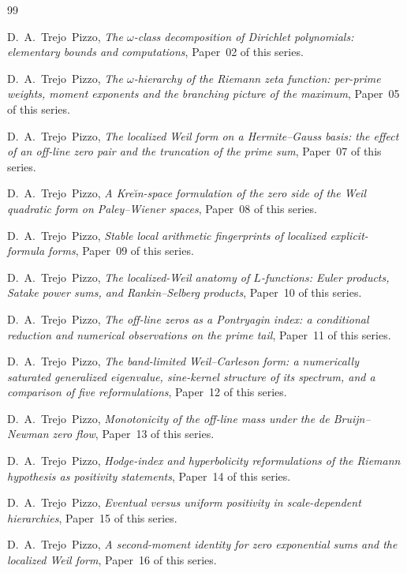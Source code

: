 \documentclass[11pt]{amsart}
\theoremstyle{definition}
\theoremstyle{remark}
\begin{document}
\begin{thebibliography}{99}

D.~A.\ Trejo~Pizzo,
\emph{The $\omega$-class decomposition of Dirichlet polynomials: elementary bounds and computations},
Paper~02 of this series.

D.~A.\ Trejo~Pizzo,
\emph{The $\omega$-hierarchy of the Riemann zeta function: per-prime weights, moment exponents and the branching picture of the maximum},
Paper~05 of this series.

D.~A.\ Trejo~Pizzo,
\emph{The localized Weil form on a Hermite--Gauss basis: the effect of an off-line zero pair and the truncation of the prime sum},
Paper~07 of this series.

D.~A.\ Trejo~Pizzo,
\emph{A Kre\u\i n-space formulation of the zero side of the Weil quadratic form on Paley--Wiener spaces},
Paper~08 of this series.

D.~A.\ Trejo~Pizzo,
\emph{Stable local arithmetic fingerprints of localized explicit-formula forms},
Paper~09 of this series.

D.~A.\ Trejo~Pizzo,
\emph{The localized-Weil anatomy of $L$-functions: Euler products, Satake power sums, and Rankin--Selberg products},
Paper~10 of this series.

D.~A.\ Trejo~Pizzo,
\emph{The off-line zeros as a Pontryagin index: a conditional reduction and numerical observations on the prime tail},
Paper~11 of this series.

D.~A.\ Trejo~Pizzo,
\emph{The band-limited Weil--Carleson form: a numerically saturated generalized eigenvalue, sine-kernel structure of its spectrum, and a comparison of five reformulations},
Paper~12 of this series.

D.~A.\ Trejo~Pizzo,
\emph{Monotonicity of the off-line mass under the de Bruijn--Newman zero flow},
Paper~13 of this series.

D.~A.\ Trejo~Pizzo,
\emph{Hodge-index and hyperbolicity reformulations of the Riemann hypothesis as positivity statements},
Paper~14 of this series.

D.~A.\ Trejo~Pizzo,
\emph{Eventual versus uniform positivity in scale-dependent hierarchies},
Paper~15 of this series.

D.~A.\ Trejo~Pizzo,
\emph{A second-moment identity for zero exponential sums and the localized Weil form},
Paper~16 of this series.


\end{thebibliography}
\end{document}
